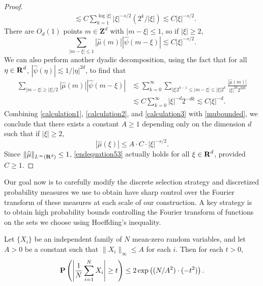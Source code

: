 \begin{proof}
\begin{equation}
\begin{split}
        &\lesssim C \sum_{k = 1}^{\log |\xi|} |\xi|^{-s/2} (2^k / |\xi| ) \lesssim C |\xi|^{-s/2}.
    \end{split}
    \end{equation}
    There are $O_d(1)$ points $m \in \mathbf{Z}^d$ with $|m - \xi| \leq 1$, so if $|\xi| \geq 2$,
    \begin{equation} \label{calculation2}
        \sum_{|m - \xi| \leq 1} |\widehat{\mu}(m)| |\widehat{\psi}(m - \xi)| \lesssim C |\xi|^{-s/2}.
    \end{equation}
    We can also perform another dyadic decomposition, using the fact that for all $\eta \in \operatorname{\mathbf{R}}^d$, $|\widehat{\psi}(\eta)| \lesssim 1/|\eta|^{2d}$, to find that
    \begin{equation} \label{calculation3}
    \begin{split}
        \sum_{|m - \xi| \geq |\xi|/2} |\widehat{\mu}(m)| |\widehat{\psi}(m - \xi)| &\lesssim \sum_{k = 0}^\infty \sum_{|\xi| 2^{k-1} \leq |m - \xi| \leq |\xi| 2^k} \frac{|\widehat{\mu}(m)|}{|\xi|^{2d} 2^{2dk}}\\
        &\lesssim C \sum_{k = 0}^\infty |\xi|^{-d} 2^{-dk} \lesssim C |\xi|^{-d}.
    \end{split}
    \end{equation}
    Combining \eqref{calculation1}, \eqref{calculation2}, and \eqref{calculation3} with \eqref{mubounded}, we conclude that there exists a constant $A \geq 1$ depending only on the dimension $d$ such that if $|\xi| \geq 2$,
    \begin{equation} \label{endequation53}
        |\widehat{\mu}(\xi)| \leq A \cdot C \cdot |\xi|^{-s/2}.
    \end{equation}
    Since $\| \widehat{\mu} \|_{L^\infty(\operatorname{\mathbf{R}}^d)} \leq 1$, \eqref{endequation53} actually holds for all $\xi \in \operatorname{\mathbf{R}}^d$, provided $C \geq 1$.
\end{proof}

Our goal now is to carefully modify the discrete selection strategy and discretized probability measures we use to obtain have sharp control over the Fourier transform of these measures at each scale of our construction. A key strategy is to obtain high probability bounds controlling the Fourier transform of functions on the sets we choose using Hoeffding's inequality.

\begin{theorem}
    Let $\{ X_i \}$ be an independent family of $N$ mean-zero random variables, and let $A > 0$ be a constant such that $\| X_i \|_\infty \leq A$ for each $i$. Then for each $t > 0$,
    \[ \operatorname{\mathbf{P}} \left( \left| \frac{1}{N} \sum_{i = 1}^N X_i \right| \geq t \right) \leq 2 \exp \left( (N/A^2) \cdot (- t^2) \right). \]
\end{theorem}

